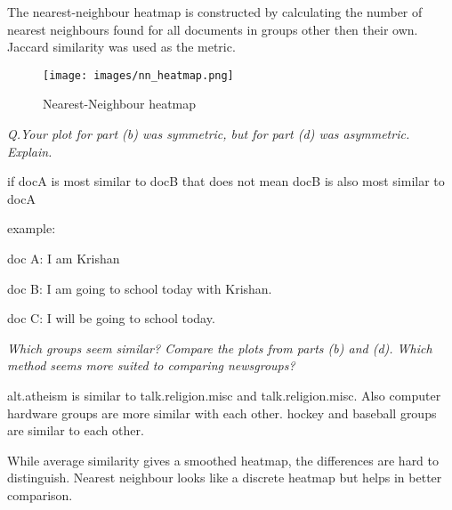 \documentclass{homeworg}
\begin{document}
The nearest-neighbour heatmap is constructed by calculating the number of nearest neighbours found for all documents in groups other then their own. Jaccard similarity was used as the metric.

\begin{figure}[!htbp]
    \centering
    \texttt{[image: images/nn\_heatmap.png]}
    \caption{Nearest-Neighbour heatmap}
    \label{fig:nn_jaccard}
\end{figure}

\emph{Q.Your plot for part (b) was symmetric, but for part (d) was asymmetric. Explain.}

if docA is most similar to docB that does not mean docB is also most similar to docA

example:

doc A: I am Krishan

doc B: I am going to school today with Krishan.

doc C: I will be going to school today.

\emph{Which groups seem similar? Compare the plots from parts (b) and (d). Which method seems more suited to comparing newsgroups?}

alt.atheism is similar to talk.religion.misc and talk.religion.misc.
Also computer hardware groups are more similar with each other. hockey and baseball groups are similar to each other.

While average similarity gives a smoothed heatmap, the differences are hard to distinguish. Nearest neighbour looks like a discrete heatmap but helps in better comparison.
\end{document}
